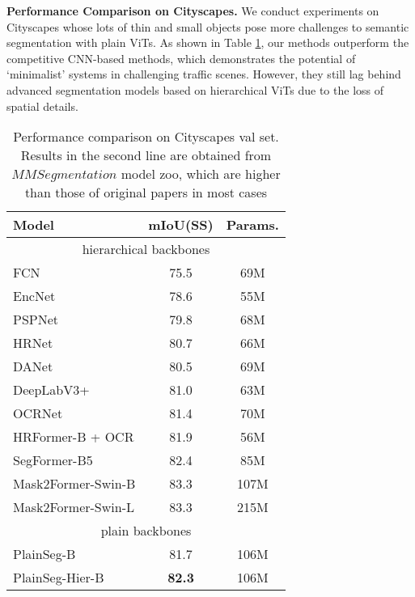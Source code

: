 \documentclass{article} \usepackage{iclr2024_conference,times}
\begin{document}
\textbf{Performance Comparison on Cityscapes.} We conduct experiments on Cityscapes whose lots of thin and small objects pose more challenges to semantic segmentation with plain ViTs. As shown in Table \ref{tab:11}, our methods outperform the competitive CNN-based methods, which demonstrates the potential of `minimalist' systems in challenging traffic scenes. However, they still lag behind advanced segmentation models based on hierarchical ViTs due to the loss of spatial details.

\begin{table}[h]
\caption{Performance comparison on Cityscapes val set. Results in the second line are obtained from $\mathit{MMSegmentation}$ model zoo, which are higher than those of original papers in most cases}
\begin{center}
\label{tab:11}
\begin{tabular}{l|cc}
\toprule
Model                                     & mIoU(SS)                    & Params.     \\ \midrule
\multicolumn{3}{c}{hierarchical backbones} \\ \midrule
FCN\cite{long2015fully}                   & 75.5                       & 69M       \\
EncNet\cite{zhang2018context}             & 78.6                        & 55M       \\
PSPNet\cite{zhao2017pyramid}              & 79.8                       & 68M       \\
HRNet\cite{wang2020deep}                  & 80.7                       & 66M       \\
DANet\cite{fu2019dual}                    & 80.5                     & 69M       \\
DeepLabV3+\cite{chen2018encoder}          & 81.0                      & 63M       \\
OCRNet\cite{yuan2020object}               & 81.4                     & 70M       \\ \midrule
HRFormer-B + OCR\cite{yuan2021hrformer}   & 81.9                       & 56M           \\
SegFormer-B5\cite{xie2021segformer}       & 82.4                      & 85M       \\
Mask2Former-Swin-B\cite{cheng2022masked}  & 83.3                      & 107M    \\
Mask2Former-Swin-L\cite{cheng2022masked}  & 83.3                      & 215M\\ \midrule
\multicolumn{3}{c}{plain backbones} \\ \midrule
PlainSeg-B                                & 81.7  & 106M \\
PlainSeg-Hier-B                                & \textbf{82.3}  & 106M \\ \bottomrule
\end{tabular}
\end{center}
\end{table}
\end{document}
